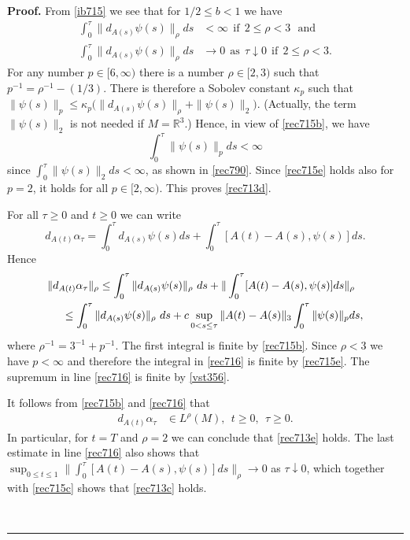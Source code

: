 \documentclass[12pt]{article}
\newenvironment{proof}[1][Proof]{\textbf{#1.} }{\ \rule{0.5em}{0.5em}}
\def \({\Big(}
\def \){\Big)}
\def \R{\mathbb R}
\def \beq{\begin{equation}}
\def \eeq{\end{equation}}
\def \eref{\eqref}
\numberwithin{equation}{section}
\begin{document}
            \begin{proof}             
 From  \eref{ib715} we see that for $1/2 \le b <1$ we have 
    \begin{align}
   \int_0^\tau \|d_{A(s)} \psi(s)\|_\rho ds  
           &< \infty  \ \ \text{if}\ \ 2\le \rho<3\ \ \ \text{and}  \label{rec715b} \\
   \int_0^\tau \|d_{A(s)} \psi(s)\|_\rho  ds  
          &\rightarrow 0\ \  \text{as}\ \  \tau\downarrow 0 \ \ \text{if}\ \ 2\le \rho<3.  \label{rec715c}
   \end{align}
   For any number $p \in [6,\infty)$ there is a number $\rho \in [2,3)$ such that $p^{-1} = \rho^{-1} - (1/3)$.
   There is therefore a Sobolev constant $\kappa_p$ such that 
   $ \|\psi(s)\|_p \le \kappa_p\(\|d_{A(s)} \psi(s)\|_\rho + \|\psi(s)\|_2\)$. 
      (Actually, the term $\|\psi(s)\|_2$ is not needed if $M = \R^3$.) 
   Hence, in view of \eref{rec715b}, we have  
   \beq
   \int_0^\tau \|\psi(s)\|_p ds <\infty                         \label{rec715e}
   \eeq
       since $\int_0^\tau\|\psi(s)\|_2 ds < \infty$,  as shown in \eref{rec790}. 
   Since \eref{rec715e} holds also for $p = 2$, it holds for  all $p \in [2, \infty)$.      
   This proves \eref{rec713d}.    
   
   For all  $\tau \ge 0$    
   and $ t \ge 0$  we can write 
\beq
d_{A(t)}\alpha_\tau = \int_0^\tau d_{A(s)} \psi(s) ds + \int_0^\tau [A(t) - A(s), \psi(s)] ds.  \label{rec714}
\eeq
Hence 
   \begin{align}
   &\|d_{A(t)} \alpha_\tau \|_\rho  \le \int_0^\tau  \|d_{A(s)} \psi(s)\|_\rho\ ds 
                                                                                    + \| \int_0^\tau [A(t) - A(s), \psi(s)] ds\|_\rho   \notag\\
    &\ \ \ \  \le   \int_0^\tau  \|d_{A(s)} \psi(s)\|_\rho\ ds 
                   + c \sup_{0 < s \le \tau}\| A(t) - A(s)\|_3\int_0^\tau \|\psi(s)\|_p ds,            \label{rec716}
 \end{align}
 where $\rho^{-1} = 3^{-1} + p^{-1}$. The first integral is finite by \eref{rec715b}. 
 Since  $\rho <3$ we have  $p < \infty$ and therefore the integral 
 in \eref{rec716}   is finite  by \eref{rec715e}.  
 The supremum in line \eref{rec716} is finite by \eref{vst356}.
 
             It follows from  
       \eref{rec715b} and \eref{rec716} that  
\begin{align}
d_{A(t)}\alpha_\tau &\in L^\rho( M),\ \  t \ge 0, \ \ \tau \ge 0.    
    \label{rec713a}
\end{align} 
In particular, for $t = T$ and $\rho =2$ we can conclude that \eref{rec713e} holds.
The last estimate in line \eref{rec716} also shows that 
$\sup_{0\le t \le 1}\| \int_0^\tau [A(t) - A(s), \psi(s)] ds\|_\rho \rightarrow 0$ 
 as $\tau \downarrow 0$, which together with   \eref{rec715c} shows that \eref{rec713c} holds. 


\end{proof}
\end{document}
